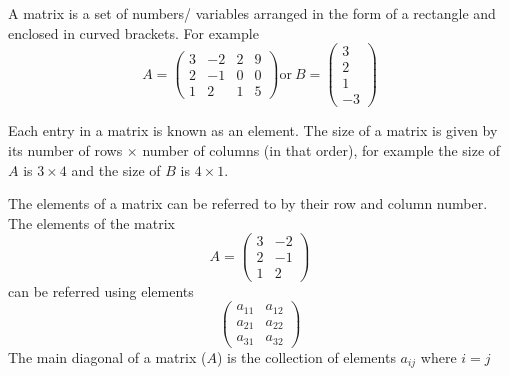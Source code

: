 
A matrix is a set of numbers/ variables arranged in the form of a rectangle and enclosed in curved brackets. For example
\begin{equation*}
A = 
\begin{pmatrix}
    3 & -2 & 2 & 9\\
    2 & -1 & 0 & 0\\
    1 & 2 & 1 & 5
\end{pmatrix}
\mathrm{or\ }
B=
\begin{pmatrix}
    3\\
    2\\
    1\\
    -3
\end{pmatrix}
\end{equation*}

Each entry in a matrix is known as an element. The size of a matrix is given by its number of rows $\times$ number of columns (in that order), for example the size of $A$ is $3 \times 4$ and the size of $B$ is $4 \times 1$.

The elements of a matrix can be referred to by their row and column number. The elements of the matrix
\[A= \begin{pmatrix}
    3 & -2\\
    2 & -1\\
    1 & 2
\end{pmatrix} \]
can be referred using elements
\[\begin{pmatrix}
    a_{11} & a_{12}\\
    a_{21} & a_{22}\\
    a_{31} & a_{32}
\end{pmatrix}\]
The main diagonal of a matrix ($A$) is the collection of elements $a_{ij}$ where $i=j$

